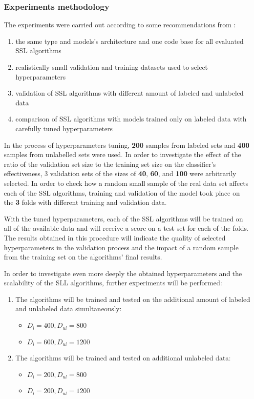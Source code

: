 \documentclass[12pt]{article}
\theoremstyle{definition}
\DeclareRobustCommand{\[}{\begin{equation}}
\DeclareRobustCommand{\]}{\end{equation}}
\begin{document}
\subsubsection{Experiments methodology}
\par The experiments were carried out according to some recommendations from \cite{Realistic}:
\begin{enumerate}
    \item the same type and models's architecture and one code base for all evaluated SSL algorithms 
    \item realistically small validation and training datasets used to select hyperparameters
    \item validation of SSL algorithms with different amount of labeled and unlabeled data
    \item comparison of SSL algorithms with models trained only on labeled data with carefully tuned hyperparameters
\end{enumerate}
\par
In the process of hyperparameters tuning, \textbf{200} samples from labeled sets and \textbf{400} samples from unlabelled sets were used.
In order to investigate the effect of the ratio of the validation set size to the training set size on the classifier's effectiveness, 3 validation sets of the sizes of \textbf{40}, \textbf{60}, and \textbf{100} were arbitrarily selected. 
In order to check how a random small sample of the real data set  affects each of the SSL algorithms, training and validation of the model took  place on the \textbf{3} folds with different training and validation data. \par

With the tuned hyperparameters, each of the SSL algorithms will be trained on all of the available data and will receive a score on a test set for each of the folds. The results obtained in this procedure will indicate the quality of selected hyperparameters in the validation process and the impact of a random sample from the training set on the algorithms' final results.

In order to investigate even more deeply the obtained hyperparameters and the scalability of the SLL algorithms, further experiments will be performed:
    \begin{enumerate}
        \item The algorithms will be trained and tested on the additional amount of labeled and unlabeled data simultaneously:
            \begin{itemize}
                \item $D_l = 400, D_{ul} = 800$
                \item $D_l = 600, D_{ul} = 1200$
            \end{itemize}
        \item The algorithms will be trained and tested on additional unlabeled data:
            \begin{itemize}
                    \item $D_l = 200, D_{ul} = 800$
                    \item $D_l = 200, D_{ul} = 1200$
            \end{itemize}
    \end{enumerate}
\end{document}
